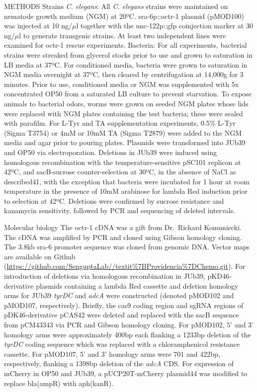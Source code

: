 \documentclass[]{article}
\begin{document}
METHODS Strains \textit{C. elegans}: All \textit{C. elegans} strains
were maintained on nematode growth medium (NGM) at 20ºC. sra-6p::octr-1
plasmid (pMOD100) was injected at 10 ng/\(\mu\)l together with the
unc-122p::gfp coinjection marker at 30 ng/\(\mu\)l to generate
transgenic strains. At least two independent lines were examined for
octr-1 rescue experiments. Bacteria: For all experiments, bacterial
strains were streaked from glycerol stocks prior to use and grown to
saturation in LB media at 37ºC. For conditioned media, bacteria were
grown to saturation in NGM media overnight at 37ºC, then cleared by
centrifugation at 14,000g for 3 minutes. Prior to use, conditioned media
or NGM was supplemented with 5x concentrated OP50 from a saturated LB
culture to prevent starvation. To expose animals to bacterial odors,
worms were grown on seeded NGM plates whose lids were replaced with NGM
plates containing the test bacteria; these were sealed with parafilm.
For L-Tyr and TA supplementation experiments, 0.5\% L-Tyr (Sigma T3754)
or 4mM or 10mM TA (Sigma T2879) were added to the NGM media and agar
prior to pouring plates. Plasmids were transformed into JUb39 and OP50
via electroporation. Deletions in JUb39 were induced using homologous
recombination with the temperature-sensitive pSC101 replicon at 42ºC,
and sacB-sucrose counter-selection at 30ºC, in the absence of NaCl as
described41, with the exception that bacteria were incubated for 1 hour
at room temperature in the presence of 10mM arabinose for lambda Red
induction prior to selection at 42ºC. Deletions were confirmed by
sucrose resistance and kanamycin sensitivity, followed by PCR and
sequencing of deleted intervals.

Molecular biology The octr-1 cDNA was a gift from Dr.~Richard
Komuniecki. The cDNA was amplified by PCR and cloned using Gibson
homology cloning. The 3.8kb sra-6 promoter sequence was cloned from
genomic DNA. Vector maps are available on Github
(\url{https://github.com/SenguptaLab//textit\%7BProvidencia\%7DChemo.git}).
For introduction of deletions via homologous recombination in JUb39,
pKD46-derivative plasmids containing a lambda Red cassette and deletion
homology arms for JUb39 \textit{tyrDC} and \textit{adcA} were
constructed (denoted pMOD102 and pMOD107, respectively). Briefly, the
cas9 coding region and sgRNA regions of pDK46-derivative pCAS42 were
deleted and replaced with the sacB sequence from pCM43343 via PCR and
Gibson homology cloning. For pMOD102, 5' and 3' homology arms were
approximately 400bp each flanking a 1233bp deletion of the
\textit{tyrDC} coding sequence which was replaced with a chloramphenicol
resistance cassette. For pMOD107, 5' and 3' homology arms were 701 and
422bp, respectively, flanking a 1398bp deletion of the \textit{adcA}
CDS. For expression of mCherry in OP50 and JUb39, a pUCP20T-mCherry
plasmid44 was modified to replace bla(ampR) with aph(kanR).
\end{document}
